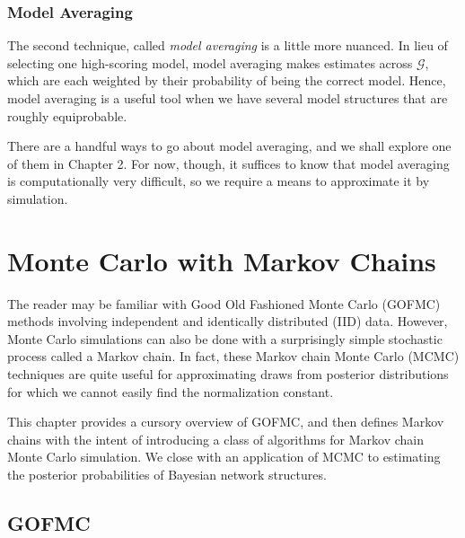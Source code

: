 \documentclass[12pt,twoside]{reedthesis}
\begin{document}
	\subsection*{Model Averaging}
	The second technique, called {\em model averaging} is a little more nuanced. In lieu of selecting one high-scoring model, model averaging makes estimates across $\mathcal G$, which are each weighted by their probability of being the correct model. Hence, model averaging is a useful tool when we have several model structures that are roughly equiprobable. 
	
	There are a handful ways to go about model averaging, and we shall explore one of them in Chapter 2. For now, though, it suffices to know that model averaging is computationally very difficult, so we require a means to approximate it by simulation.
	
\chapter{Monte Carlo with Markov Chains}
	The reader may be familiar with Good Old Fashioned Monte Carlo (GOFMC) methods involving independent and identically distributed (IID) data. However, Monte Carlo simulations can also be done with a surprisingly simple stochastic process called a Markov chain. In fact, these Markov chain Monte Carlo (MCMC) techniques are quite useful for approximating draws from posterior distributions for which we cannot easily find the normalization constant. 
	
	This chapter provides a cursory overview of GOFMC, and then defines Markov chains with the intent of introducing a class of algorithms for Markov chain Monte Carlo simulation. 
	We close with an application of MCMC to estimating the posterior probabilities of Bayesian network structures.
	
	\section{GOFMC}
\end{document}
